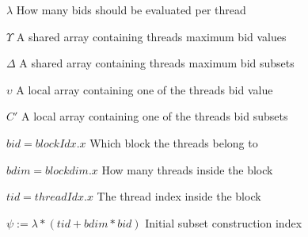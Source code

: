 \documentclass[a4paper, 12pt]{report}
\begin{document}
$\lambda$ \hfill How many bids should be evaluated per thread

$\Upsilon$ \hfill A shared array containing threads maximum bid values

$\Delta$ \hfill A shared array containing threads maximum bid subsets

$\upsilon$ \hfill A local array containing one of the threads bid value

$C'$ \hfill A local array containing one of the threads bid subsets

$bid = blockIdx.x$ \hfill Which block the threads belong to

$bdim = blockdim.x$ \hfill How many threads inside the block

$tid = threadIdx.x$ \hfill The thread index inside the block

$\psi := \lambda*(tid+bdim*bid)$ \hfill Initial subset construction index
\end{document}
